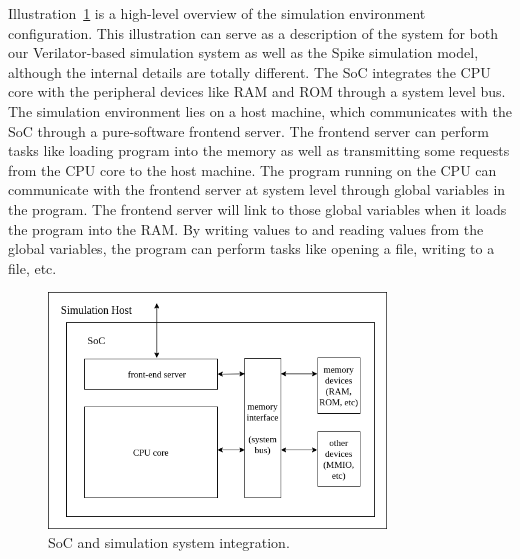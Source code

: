 Illustration~\ref{fig:450-soc-sys} is a high-level overview of the simulation environment configuration. This illustration can serve as a description of the system for both our Verilator-based simulation system as well as the Spike simulation model, although the internal details are totally different. The SoC integrates the CPU core with the peripheral devices like RAM and ROM through a system level bus. The simulation environment lies on a host machine, which communicates with the SoC through a pure-software frontend server. The frontend server can perform tasks like loading program into the memory as well as transmitting some requests from the CPU core to the host machine. The program running on the CPU can communicate with the frontend server at system level through global variables in the program. The frontend server will link to those global variables when it loads the program into the RAM. By writing values to and reading values from the global variables, the program can perform tasks like opening a file, writing to a file, etc.

\begin{figure}[!htp]
    \centering
    \includegraphics[width=0.8\textwidth]{figure/450-dr3-sys.png}
    \caption{SoC and simulation system integration.}
    \label{fig:450-soc-sys}
\end{figure}
